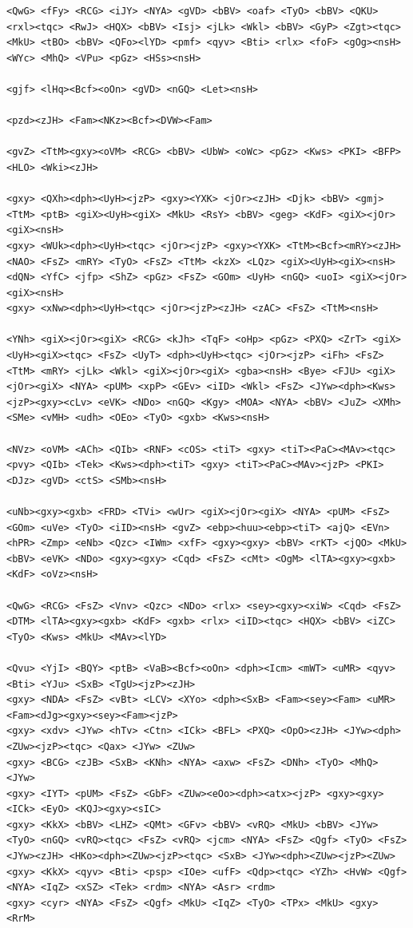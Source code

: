 \documentclass[10pt,letterpaper,twocolumn]{article}
\begin{document}
\begin{promptbox}
\begin{Verbatim}
<QwG> <fFy> <RCG> <iJY> <NYA> <gVD> <bBV> <oaf> <TyO> <bBV> <QKU> <rxl><tqc> <RwJ> <HQX> <bBV> <Isj> <jLk> <Wkl> <bBV> <GyP> <Zgt><tqc> <MkU> <tBO> <bBV> <QFo><lYD> <pmf> <qyv> <Bti> <rlx> <foF> <gOg><nsH> <WYc> <MhQ> <VPu> <pGz> <HSs><nsH>

<gjf> <lHq><Bcf><oOn> <gVD> <nGQ> <Let><nsH>

<pzd><zJH> <Fam><NKz><Bcf><DVW><Fam>

<gvZ> <TtM><gxy><oVM> <RCG> <bBV> <UbW> <oWc> <pGz> <Kws> <PKI> <BFP> <HLO> <Wki><zJH>

<gxy> <QXh><dph><UyH><jzP> <gxy><YXK> <jOr><zJH> <Djk> <bBV> <gmj> <TtM> <ptB> <giX><UyH><giX> <MkU> <RsY> <bBV> <geg> <KdF> <giX><jOr><giX><nsH>
<gxy> <WUk><dph><UyH><tqc> <jOr><jzP> <gxy><YXK> <TtM><Bcf><mRY><zJH> <NAO> <FsZ> <mRY> <TyO> <FsZ> <TtM> <kzX> <LQz> <giX><UyH><giX><nsH> <dQN> <YfC> <jfp> <ShZ> <pGz> <FsZ> <GOm> <UyH> <nGQ> <uoI> <giX><jOr><giX><nsH>
<gxy> <xNw><dph><UyH><tqc> <jOr><jzP><zJH> <zAC> <FsZ> <TtM><nsH>

<YNh> <giX><jOr><giX> <RCG> <kJh> <TqF> <oHp> <pGz> <PXQ> <ZrT> <giX><UyH><giX><tqc> <FsZ> <UyT> <dph><UyH><tqc> <jOr><jzP> <iFh> <FsZ> <TtM> <mRY> <jLk> <Wkl> <giX><jOr><giX> <gba><nsH> <Bye> <FJU> <giX><jOr><giX> <NYA> <pUM> <xpP> <GEv> <iID> <Wkl> <FsZ> <JYw><dph><Kws><jzP><gxy><cLv> <eVK> <NDo> <nGQ> <Kgy> <MOA> <NYA> <bBV> <JuZ> <XMh> <SMe> <vMH> <udh> <OEo> <TyO> <gxb> <Kws><nsH>

<NVz> <oVM> <ACh> <QIb> <RNF> <cOS> <tiT> <gxy> <tiT><PaC><MAv><tqc> <pvy> <QIb> <Tek> <Kws><dph><tiT> <gxy> <tiT><PaC><MAv><jzP> <PKI> <DJz> <gVD> <ctS> <SMb><nsH>

<uNb><gxy><gxb> <FRD> <TVi> <wUr> <giX><jOr><giX> <NYA> <pUM> <FsZ> <GOm> <uVe> <TyO> <iID><nsH> <gvZ> <ebp><huu><ebp><tiT> <ajQ> <EVn> <hPR> <Zmp> <eNb> <Qzc> <IWm> <xfF> <gxy><gxy> <bBV> <rKT> <jQO> <MkU> <bBV> <eVK> <NDo> <gxy><gxy> <Cqd> <FsZ> <cMt> <OgM> <lTA><gxy><gxb> <KdF> <oVz><nsH>

<QwG> <RCG> <FsZ> <Vnv> <Qzc> <NDo> <rlx> <sey><gxy><xiW> <Cqd> <FsZ> <DTM> <lTA><gxy><gxb> <KdF> <gxb> <rlx> <iID><tqc> <HQX> <bBV> <iZC> <TyO> <Kws> <MkU> <MAv><lYD>

<Qvu> <YjI> <BQY> <ptB> <VaB><Bcf><oOn> <dph><Icm> <mWT> <uMR> <qyv> <Bti> <YJu> <SxB> <TgU><jzP><zJH>
<gxy> <NDA> <FsZ> <vBt> <LCV> <XYo> <dph><SxB> <Fam><sey><Fam> <uMR> <Fam><dJg><gxy><sey><Fam><jzP>
<gxy> <xdv> <JYw> <hTv> <Ctn> <ICk> <BFL> <PXQ> <OpO><zJH> <JYw><dph><ZUw><jzP><tqc> <Qax> <JYw> <ZUw>
<gxy> <BCG> <zJB> <SxB> <KNh> <NYA> <axw> <FsZ> <DNh> <TyO> <MhQ> <JYw>
<gxy> <IYT> <pUM> <FsZ> <GbF> <ZUw><eOo><dph><atx><jzP> <gxy><gxy> <ICk> <EyO> <KQJ><gxy><sIC>
<gxy> <KkX> <bBV> <LHZ> <QMt> <GFv> <bBV> <vRQ> <MkU> <bBV> <JYw> <TyO> <nGQ> <vRQ><tqc> <FsZ> <vRQ> <jcm> <NYA> <FsZ> <Qgf> <TyO> <FsZ> <JYw><zJH> <HKo><dph><ZUw><jzP><tqc> <SxB> <JYw><dph><ZUw><jzP><ZUw>
<gxy> <KkX> <qyv> <Bti> <psp> <IOe> <ufF> <Qdp><tqc> <YZh> <HvW> <Qgf> <NYA> <IqZ> <xSZ> <Tek> <rdm> <NYA> <Asr> <rdm>
<gxy> <cyr> <NYA> <FsZ> <Qgf> <MkU> <IqZ> <TyO> <TPx> <MkU> <gxy> <RrM>


\end{Verbatim}
\end{promptbox}
\end{document}
